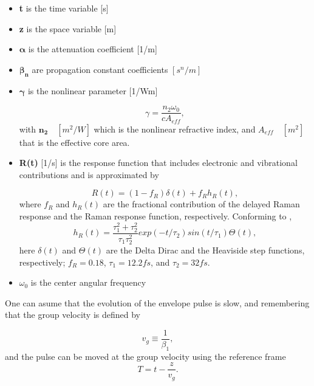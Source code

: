     \begin{itemize}
        \item \textbf{t} is the time variable [s]
        \item \textbf{z} is the space variable [m]
        \item $\mathbf{\alpha}$ is the attenuation coefficient [1/m]
        \item $\mathbf{\beta_n}$ are propagation constant coefficients $[s^n/m]$
        \item $\mathbf{\gamma}$ is the nonlinear parameter [1/Wm]
        
            \begin{equation}
                \gamma = \frac{n_2 \omega_0}{c A_{eff}},
                \label{eq_gamma}
            \end{equation}
        with $\mathbf{n_2} \quad [m^2/W]$ which is the nonlinear refractive index, and $A_{eff} \quad [m^2]$ that  is the  effective core area.
        \item \textbf{R(t)} [1/s] is the response function that includes electronic and vibrational contributions and is approximated by 
        
        \begin{equation}\label{eq_rt}
            R(t) = (1- f_R)\delta(t) + f_R h_R(t),
        \end{equation}
        where $f_R$ and $h_R(t)$ are the fractional contribution of the delayed Raman response and the Raman response function, respectively. Conforming to \cite{dudley_taylor_2010}, 
        \begin{equation}\label{eq_hr}
            h_R(t) = \frac{\tau^2_1+\tau^2_2}{\tau_1\tau^2_2} exp(-t/\tau_2)sin(t/\tau_1)\Theta(t),
        \end{equation}
        here $\delta(t)$ and $\Theta(t)$ are the Delta Dirac and the Heaviside step functions, respectively; $f_R = 0.18$,  $\tau_1 =12.2 fs$, and $\tau_2 = 32 fs$.
         
         
        \item $\omega_0$  is the center angular frequency
    
    \end{itemize}
   
    One can asume that the evolution of the envelope pulse is slow, and remembering that the group velocity is defined by 
    
    \begin{equation}\label{eq_vg}
        v_g \equiv \frac{1}{\beta_1}, 
    \end{equation}
    and the pulse can be moved at the group velocity using the reference frame 
    \begin{equation}\label{eq_t}
        T = t - \frac{z}{v_g}. 
    \end{equation}
    
